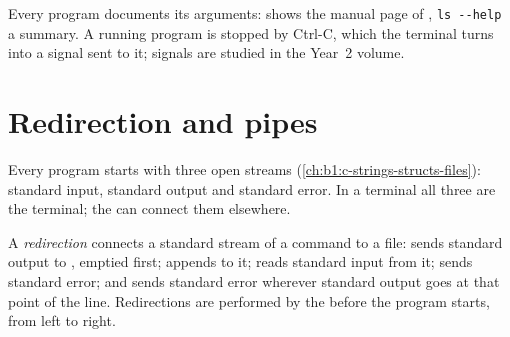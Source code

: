 \label{out:b1:the-shell:env}

Every program documents its arguments:  shows the manual page of , \texttt{ls -{}-{}help} a summary.
A running program is stopped by Ctrl-C, which the terminal turns into a signal sent to it; signals are studied in the
Year~2 volume.

\section{Redirection and pipes}\label{sec:b1:the-shell:pipes}

Every program starts with three open streams (\cref{ch:b1:c-strings-structs-files}): standard input, standard output
and standard error. In a terminal all three are the terminal; the  can connect them elsewhere.

\begin{definition}[Redirection]\label{def:b1:the-shell:redirection}
A \emph{redirection} connects a standard stream of a command to a file:  sends standard
output to , emptied first;  appends to it;  reads standard input from it; 
sends standard error; and  sends standard error wherever standard output goes at that point of the line.
Redirections are performed by the  before the program starts, from left to right.
\end{definition}

\label{out:b1:the-shell:redirect}

